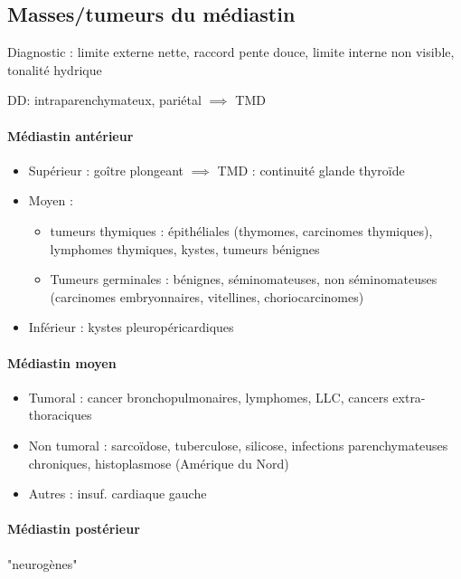 \documentclass{article}
\begin{document}
\subsection{Masses/tumeurs du médiastin}
Diagnostic : limite externe nette, raccord pente douce, limite interne non
visible, tonalité hydrique

DD: intraparenchymateux, pariétal $\implies$ TMD

\paragraph{Médiastin antérieur}
\begin{itemize}
\item Supérieur : goître plongeant $\implies$ TMD : continuité glande thyroïde
\item Moyen : 
  \begin{itemize}
  \item tumeurs thymiques : épithéliales (thymomes, carcinomes thymiques),
    lymphomes thymiques, kystes, tumeurs bénignes
  \item Tumeurs germinales : bénignes, séminomateuses, non séminomateuses
    (carcinomes embryonnaires, vitellines, choriocarcinomes)
  \end{itemize}
\item Inférieur : kystes pleuropéricardiques
\end{itemize}

\paragraph{Médiastin moyen}
\begin{itemize}
\item Tumoral : cancer bronchopulmonaires, lymphomes, LLC, cancers
  extra-thoraciques
\item Non tumoral : sarcoïdose, tuberculose, silicose, infections
  parenchymateuses chroniques, histoplasmose (Amérique du Nord)
\item Autres : insuf. cardiaque gauche
\end{itemize}

\paragraph{Médiastin postérieur} "neurogènes"
\end{document}
